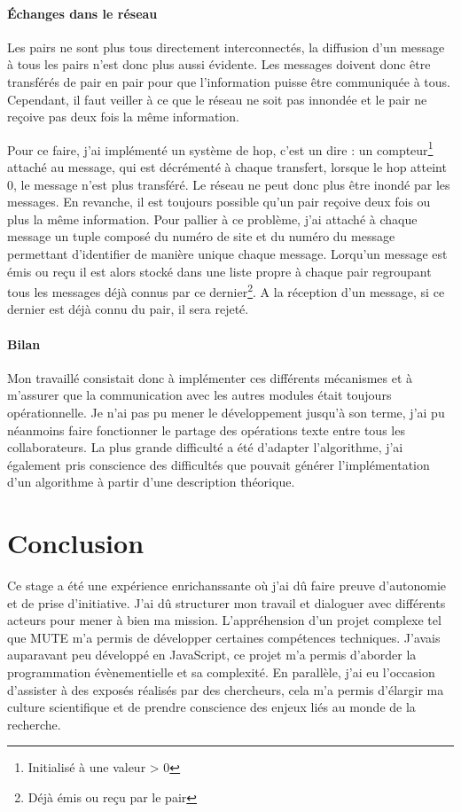 \documentclass{tnreport}
\begin{document}
\subsubsection{Échanges dans le réseau}
Les pairs ne sont plus tous directement interconnectés, la diffusion d'un message à tous les pairs n'est donc plus aussi évidente. Les messages doivent donc être transférés de pair en pair pour que l'information puisse être communiquée à tous. Cependant, il faut veiller à ce que le réseau ne soit pas innondée et le pair ne reçoive pas deux fois la même information.

Pour ce faire, j'ai implémenté un système de hop, c'est un dire : un compteur\footnote{Initialisé à une valeur > 0} attaché au message, qui est décrémenté à chaque transfert, lorsque le hop atteint 0, le message n'est plus transféré. Le réseau ne peut donc plus être inondé par les messages. En revanche, il est toujours possible qu'un pair reçoive deux fois ou plus la même information. Pour pallier à ce problème, j'ai attaché à chaque message un tuple composé du numéro de site et du numéro du message permettant d'identifier de manière unique chaque message. Lorqu'un message est émis ou reçu il est alors stocké dans une liste propre à chaque pair regroupant tous les messages déjà connus par ce dernier\footnote{Déjà émis ou reçu par le pair}. A la réception d'un message, si ce dernier est déjà connu du pair, il sera rejeté. 

\subsubsection{Bilan}
Mon travaillé consistait donc à implémenter ces différents mécanismes et à m'assurer que la communication avec les autres modules était toujours opérationnelle. Je n'ai pas pu mener le développement jusqu'à son terme, j'ai pu néanmoins faire fonctionner le partage des opérations texte entre tous les collaborateurs. La plus grande difficulté a été d'adapter l'algorithme, j'ai également pris conscience des difficultés que pouvait générer l'implémentation d'un algorithme à partir d'une description théorique.

\chapter{Conclusion}
Ce stage a été une expérience enrichanssante où j'ai dû faire preuve d'autonomie et de prise d'initiative. J'ai dû structurer mon travail et dialoguer avec différents acteurs pour mener à bien ma mission. L'appréhension d'un projet complexe tel que MUTE m'a permis de développer certaines compétences techniques. J'avais auparavant peu développé en JavaScript, ce projet m'a permis d'aborder la programmation évènementielle et sa complexité. En parallèle, j'ai eu l'occasion d'assister à des exposés réalisés par des chercheurs, cela m'a permis d'élargir ma culture scientifique et de prendre conscience des enjeux liés au monde de la recherche.
\end{document}
